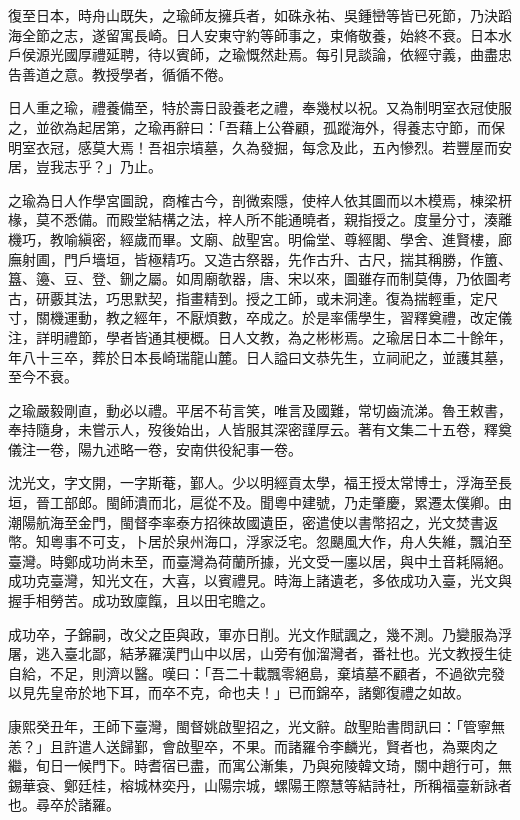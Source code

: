 \begin{pinyinscope}
復至日本，時舟山既失，之瑜師友擁兵者，如硃永祐、吳鍾巒等皆已死節，乃決蹈海全節之志，遂留寓長崎。日人安東守約等師事之，束脩敬養，始終不衰。日本水戶侯源光國厚禮延聘，待以賓師，之瑜慨然赴焉。每引見談論，依經守義，曲盡忠告善道之意。教授學者，循循不倦。

日人重之瑜，禮養備至，特於壽日設養老之禮，奉幾杖以祝。又為制明室衣冠使服之，並欲為起居第，之瑜再辭曰：「吾藉上公眷顧，孤蹤海外，得養志守節，而保明室衣冠，感莫大焉！吾祖宗墳墓，久為發掘，每念及此，五內慘烈。若豐屋而安居，豈我志乎？」乃止。

之瑜為日人作學宮圖說，商榷古今，剖微索隱，使梓人依其圖而以木模焉，棟梁枅椽，莫不悉備。而殿堂結構之法，梓人所不能通曉者，親指授之。度量分寸，湊離機巧，教喻縝密，經歲而畢。文廟、啟聖宮。明倫堂、尊經閣、學舍、進賢樓，廊廡射圃，門戶墻垣，皆極精巧。又造古祭器，先作古升、古尺，揣其稱勝，作簠、簋、籩、豆、登、鉶之屬。如周廟欹器，唐、宋以來，圖雖存而制莫傳，乃依圖考古，研覈其法，巧思默契，指畫精到。授之工師，或未洞達。復為揣輕重，定尺寸，關機運動，教之經年，不厭煩數，卒成之。於是率儒學生，習釋奠禮，改定儀注，詳明禮節，學者皆通其梗概。日人文教，為之彬彬焉。之瑜居日本二十餘年，年八十三卒，葬於日本長崎瑞龍山麓。日人謚曰文恭先生，立祠祀之，並護其墓，至今不衰。

之瑜嚴毅剛直，動必以禮。平居不茍言笑，唯言及國難，常切齒流涕。魯王敕書，奉持隨身，未嘗示人，歿後始出，人皆服其深密謹厚云。著有文集二十五卷，釋奠儀注一卷，陽九述略一卷，安南供役紀事一卷。

沈光文，字文開，一字斯菴，鄞人。少以明經貢太學，福王授太常博士，浮海至長垣，晉工部郎。閩師潰而北，扈從不及。聞粵中建號，乃走肇慶，累遷太僕卿。由潮陽航海至金門，閩督李率泰方招徠故國遺臣，密遣使以書幣招之，光文焚書返幣。知粵事不可支，卜居於泉州海口，浮家泛宅。忽颶風大作，舟人失維，飄泊至臺灣。時鄭成功尚未至，而臺灣為荷蘭所據，光文受一廛以居，與中土音耗隔絕。成功克臺灣，知光文在，大喜，以賓禮見。時海上諸遺老，多依成功入臺，光文與握手相勞苦。成功致廩餼，且以田宅贍之。

成功卒，子錦嗣，改父之臣與政，軍亦日削。光文作賦諷之，幾不測。乃變服為浮屠，逃入臺北鄙，結茅羅漢門山中以居，山旁有伽溜灣者，番社也。光文教授生徒自給，不足，則濟以醫。嘆曰：「吾二十載飄零絕島，棄墳墓不顧者，不過欲完發以見先皇帝於地下耳，而卒不克，命也夫！」已而錦卒，諸鄭復禮之如故。

康熙癸丑年，王師下臺灣，閩督姚啟聖招之，光文辭。啟聖貽書問訊曰：「管寧無恙？」且許遣人送歸鄞，會啟聖卒，不果。而諸羅令李麟光，賢者也，為粟肉之繼，旬日一候門下。時耆宿已盡，而寓公漸集，乃與宛陵韓文琦，關中趙行可，無錫華袞、鄭廷桂，榕城林奕丹，山陽宗城，螺陽王際慧等結詩社，所稱福臺新詠者也。尋卒於諸羅。


\end{pinyinscope}
